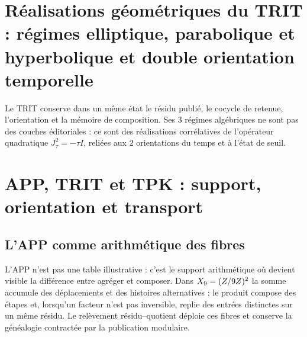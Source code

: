 \label{chap:83-02}

\section{Réalisations géométriques du TRIT : régimes elliptique, parabolique et hyperbolique et double orientation temporelle}

Le TRIT conserve dans un même état le résidu publié, le cocycle de
retenue, l’orientation et la mémoire de composition. Ses \(3\) régimes
algébriques ne sont pas des couches éditoriales : ce sont des réalisations corrélatives de
l’opérateur quadratique \(J_{\tau}^{2}=-\tau I\), reliées aux \(2\)
orientations du temps et à l’état de seuil.

\begin{HMTScientificOwnerSubordinated}
\def\HMTTRITFormal{1}
\def\HMTTRITDevelopments{1}

\let\HMTTRITFormal\undefined
\let\HMTTRITDevelopments\undefined
\end{HMTScientificOwnerSubordinated}

\begin{HMTScientificOwnerSubordinated}

\end{HMTScientificOwnerSubordinated}

\begin{HMTScientificOwnerSubordinated}

\end{HMTScientificOwnerSubordinated}

\section[APP, TRIT et TPK : support, orientation et transport]
{APP, TRIT et TPK : support, orientation et transport}

\subsection{L’APP comme arithmétique des fibres}

L’APP n’est pas une table illustrative : c’est le support arithmétique où devient
visible la différence entre agréger et composer. Dans
\(
X_9=(Z/9Z)^2
\)
la somme accumule des déplacements et des histoires alternatives ; le produit compose
des étapes et, lorsqu’un facteur n’est pas inversible, replie des entrées distinctes sur
un même résidu. Le relèvement résidu--quotient déploie ces fibres et
conserve la généalogie contractée par la publication modulaire.

